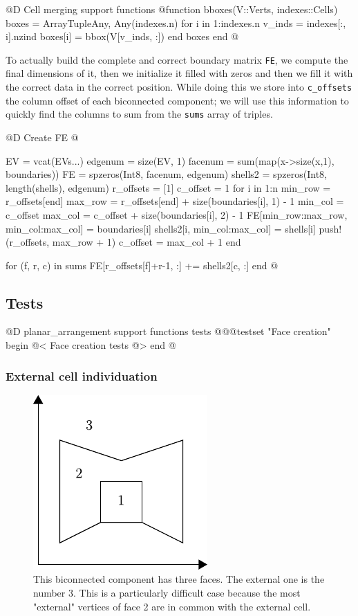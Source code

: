 @D Cell merging support functions
@{function bboxes(V::Verts, indexes::Cells)
    boxes = Array{Tuple{Any, Any}}(indexes.n)
    for i in 1:indexes.n
        v_inds = indexes[:, i].nzind
        boxes[i] = bbox(V[v_inds, :])
    end
    boxes
end
@}

To actually build the complete and correct boundary matrix \texttt{FE},
we compute the final dimensions of it, then we initialize it filled with
zeros and then we fill it with the correct data in the correct position.
While doing this we store into \texttt{c\_offsets} the column offset of each
biconnected component; we will use this information to quickly find the columns 
to sum from the \texttt{sums} array of triples.

@D Create FE
@{EV = vcat(EVs...)
edgenum = size(EV, 1)
facenum = sum(map(x->size(x,1), boundaries))
FE = spzeros(Int8, facenum, edgenum)
shells2 = spzeros(Int8, length(shells), edgenum)
r_offsets = [1]
c_offset = 1
for i in 1:n
    min_row = r_offsets[end]
    max_row = r_offsets[end] + size(boundaries[i], 1) - 1
    min_col = c_offset
    max_col = c_offset + size(boundaries[i], 2) - 1
    FE[min_row:max_row, min_col:max_col] = boundaries[i]
    shells2[i, min_col:max_col] = shells[i]
    push!(r_offsets, max_row + 1)
    c_offset = max_col + 1
end

for (f, r, c) in sums
    FE[r_offsets[f]+r-1, :] += shells2[c, :]
end
@}


\subsection{Tests}

@D planar\_arrangement support functions tests
@{@@testset "Face creation" begin
    @< Face creation tests @>
end
@}

\subsubsection{External cell individuation}
\begin{figure}[h]
    \centering
    \includegraphics{./img/ch2-externcell.pdf}
    \caption{This biconnected component has three faces. The external one is the number 3.
    This is a particularly difficult case because the most "external" vertices of face 2
    are in common with the external cell.}
\end{figure}

